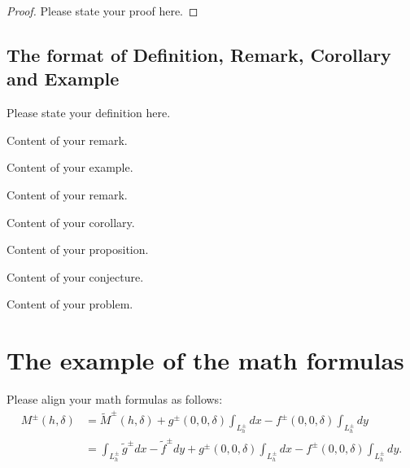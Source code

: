 \documentclass{jnma}
\begin{document}

\begin{proof}
Please state your proof here.
\end{proof}


\subsection{The format of Definition, Remark,  Corollary and Example}
\begin{definition}\label{de1} Please state your definition here.\end{definition}

\begin{remark}\label{re1} Content of your remark.\end{remark}

\begin{example}\label{ex1}Content of your example.\end{example}

\begin{notation}\label{re1} Content of your remark.\end{notation}

\begin{corollary}\label{co1}Content of your corollary.\end{corollary}

\begin{proposition} Content of your proposition. \end{proposition}

\begin{conjecture}Content of your conjecture. \end{conjecture}

\begin{problem}Content of your problem. \end{problem}





\section{The example of the math formulas}
Please align your math formulas as follows:
\begin{align*}
M^{\pm}(h,\delta)&={\widetilde{M}}^{\pm}(h,\delta)+{g}^{\pm}(0,0,\delta)\int_{L_h^{\pm}}dx-{f}^{\pm}(0,0,\delta)\int_{L_h^{\pm}}dy\\
&=\int_{L_h^{\pm}}{\widetilde{g}}^{\pm}dx-{\widetilde{f}}^{\pm}dy+{g}^{\pm}(0,0,\delta)\int_{L_h^{\pm}}dx-{f}^{\pm}(0,0,\delta)\int_{L_h^{\pm}}dy.
\end{align*}
\end{document}
